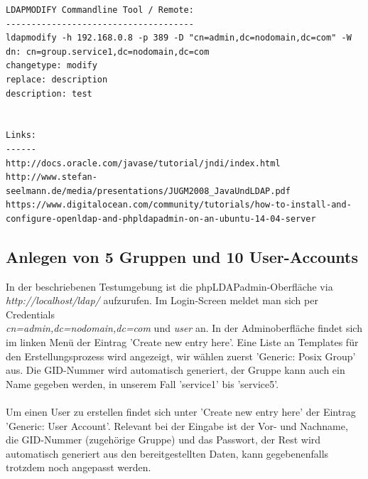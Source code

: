 \documentclass[letterpaper, 12pt]{article}
\let\tempsubsection\subsection
\renewcommand\subsection[1]{\vspace{0cm}\tempsubsection{#1}\vspace{0cm}}
\begin{document}
\newpage
\begin{lstlisting}[frame=single, caption=Grundkonfiguration]
LDAPMODIFY Commandline Tool / Remote:
-------------------------------------
ldapmodify -h 192.168.0.8 -p 389 -D "cn=admin,dc=nodomain,dc=com" -W  
dn: cn=group.service1,dc=nodomain,dc=com             
changetype: modify
replace: description
description: test


Links:
------
http://docs.oracle.com/javase/tutorial/jndi/index.html
http://www.stefan-seelmann.de/media/presentations/JUGM2008_JavaUndLDAP.pdf
https://www.digitalocean.com/community/tutorials/how-to-install-and-configure-openldap-and-phpldapadmin-on-an-ubuntu-14-04-server
\end{lstlisting}

\subsection{Anlegen von 5 Gruppen und 10 User-Accounts}
In der beschriebenen Testumgebung ist die phpLDAPadmin-Oberfläche via \textit{http://localhost/ldap/} aufzurufen. Im Login-Screen meldet man sich per Credentials \\ \textit{cn=admin,dc=nodomain,dc=com} und \textit{user} an. In der Adminoberfläche findet sich im linken Menü der Eintrag 'Create new entry here'. Eine Liste an Templates für den Erstellungsprozess wird angezeigt, wir wählen zuerst 'Generic: Posix Group' aus. Die GID-Nummer wird automatisch generiert, der Gruppe kann auch ein Name gegeben werden, in unserem Fall 'service1' bis 'service5'. \\ \\
Um einen User zu erstellen findet sich unter 'Create new entry here' der Eintrag 'Generic: User Account'. Relevant bei der Eingabe ist der Vor- und Nachname, die GID-Nummer (zugehörige Gruppe) und das Passwort, der Rest wird automatisch generiert aus den bereitgestellten Daten, kann gegebenenfalls trotzdem noch angepasst werden. \\
\end{document}
